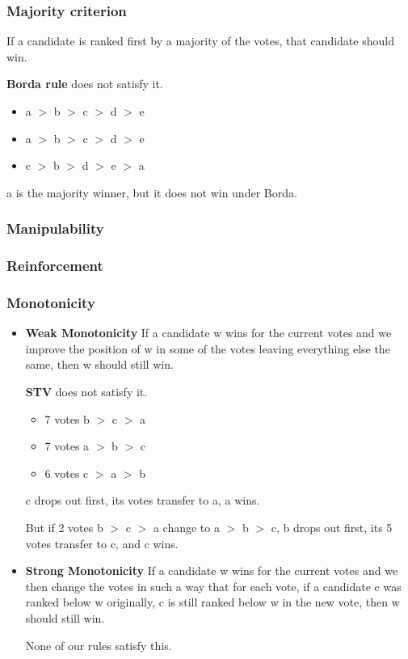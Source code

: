 	\subsubsection{Majority criterion}
	If a candidate is ranked first by a majority of the votes, that candidate should win.
	
	\begin{example} \textbf{Borda rule} does not satisfy it.
		\begin{itemize}
			\item[] a $>$ b $>$ c $>$ d $>$ e
			\item[] a $>$ b $>$ c $>$ d $>$ e
			\item[] c $>$ b $>$ d $>$ e $>$ a
		\end{itemize}
		a is the majority winner, but it does not win under Borda.
	\end{example}

	\subsubsection{Manipulability}

	\subsubsection{Reinforcement}
	
	\subsubsection{Monotonicity}
	\begin{itemize}
		\item[] \textbf{Weak Monotonicity}
		If a candidate w wins for the current votes and we improve the position of w in some of the votes leaving everything else the same, then w should still win.
		
		\begin{example} \textbf{STV} does not satisfy it.
			\begin{itemize}
				\item[] 7 votes b $>$ c $>$ a
				\item[] 7 votes a $>$ b $>$ c
				\item[] 6 votes c $>$ a $>$ b
			\end{itemize}
			c drops out first, its votes transfer to a, a wins.
			
			But if 2 votes b $>$ c $>$ a change to a $>$ b $>$ c, b drops out first, its 5 votes transfer to c, and c wins.
		\end{example}
		\item[] \textbf{Strong Monotonicity}
		If a candidate w wins for the current votes and we then change the votes in such a way that for each vote, if a
		candidate c was ranked below w originally, c is still ranked below w in the new vote, then w should still win.
		
		None of our rules satisfy this.
	\end{itemize}

